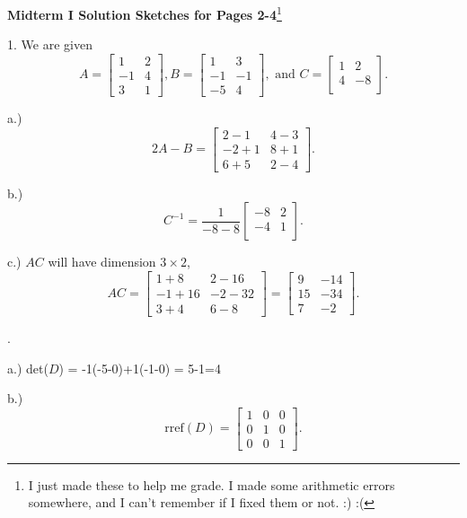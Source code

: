 \documentclass{article}
\begin{document}
\begin{center}
\textbf{Midterm I Solution Sketches for Pages 2-4}\footnote{I just made these to help me grade. I made some arithmetic errors somewhere, and I can't remember if I fixed them or not. :) :(}
\end{center}

1. We are given $$A=\left[\begin{array}{cc}
1 & 2\\
-1 & 4\\
3 & 1
\end{array}\right], B=\left[\begin{array}{cc}
1 & 3\\
-1 & -1\\
-5 & 4
\end{array}\right], \text{ and } C=\left[\begin{array}{cc}
1 & 2\\
4 & -8\\
\end{array}\right].$$



a.) $$2A-B=\left[\begin{array}{cc}
2-1 & 4-3\\
-2+1 & 8+1\\
6+5 & 2-4
\end{array}\right].$$


b.) $$C^{-1}=\frac{1}{-8-8}\left[\begin{array}{cc}
-8 & 2\\
-4 & 1\\
\end{array}\right].$$



c.) $AC$ will have dimension $3\times 2$, 
$$AC=\left[\begin{array}{cc}
1+8 & 2-16\\
-1+16 & -2-32\\
3+4 & 6 -8 
\end{array}\right]=\left[\begin{array}{cc}
9 & -14\\
15 & -34\\
7 & -2
\end{array}\right].$$


. 

a.) det($D$) = -1(-5-0)+1(-1-0) = 5-1=4


b.) $$\text{rref}(D)=\left[\begin{array}{ccc}
1 & 0 & 0\\
0 & 1 & 0 \\
0 & 0 & 1
\end{array}\right].$$
\end{document}
